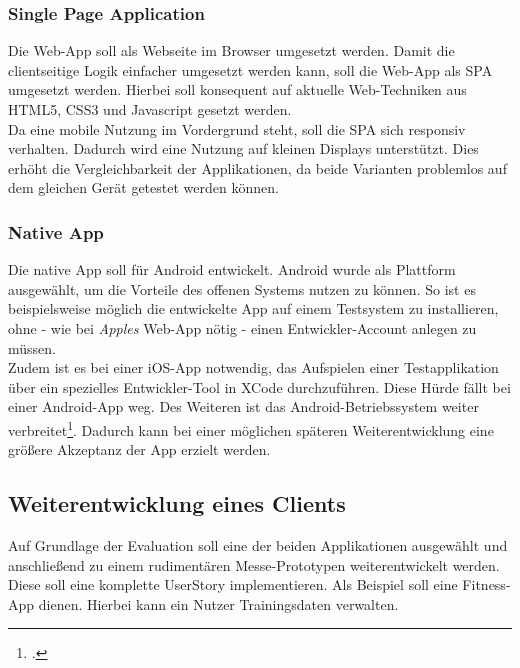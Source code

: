 \subsubsection*{Single Page Application}
\label{ssec:aufgabenstellung:spa}
Die \ac{Web-App} soll als Webseite im Browser umgesetzt werden. Damit die clientseitige Logik einfacher umgesetzt werden kann, soll die \ac{Web-App} als \ac{SPA} umgesetzt werden. Hierbei soll konsequent auf aktuelle Web-Techniken aus \gls{HTML5}, \gls{CSS3} und \gls{Javascript} gesetzt werden. \\
Da eine mobile Nutzung im Vordergrund steht, soll die \ac{SPA} sich \gls{responsiv} verhalten. Dadurch wird eine Nutzung auf kleinen Displays unterstützt. Dies erhöht die Vergleichbarkeit der Applikationen, da beide Varianten problemlos auf dem gleichen Gerät getestet werden können.
\subsubsection*{Native App}
\label{ssec:aufgabenstellung:nat-app}
Die native \gls{App} soll für \gls{Android} entwickelt. \gls{Android} wurde als Plattform ausgewählt, um die Vorteile des offenen Systems nutzen zu können. So ist es beispielsweise möglich die entwickelte App auf einem Testsystem zu installieren, ohne - wie bei \textit{Apples} \ac{Web-App} nötig - einen Entwickler-Account anlegen zu müssen.\\ 
Zudem ist es bei einer \gls{iOS}-\gls{App} notwendig, das Aufspielen einer Testapplikation über ein spezielles Entwickler-Tool in \gls{XCode} durchzuführen. Diese Hürde fällt bei einer \gls{Android}-\gls{App} weg. Des Weiteren ist das \gls{Android}-Betriebssystem weiter verbreitet\footcite{Statista-SmartphoneVerteilung}. Dadurch kann bei einer möglichen späteren Weiterentwicklung eine größere Akzeptanz der \gls{App} erzielt werden.
\subsection{Weiterentwicklung eines Clients}
\label{ssec:umsetzung-client-entwicklung}
Auf Grundlage der Evaluation soll eine der beiden Applikationen ausgewählt und anschließend zu einem rudimentären Messe-Prototypen weiterentwickelt werden. Diese soll eine komplette \gls{UserStory} implementieren. Als Beispiel soll eine Fitness-\gls{App} dienen. Hierbei kann ein Nutzer Trainingsdaten verwalten. 
